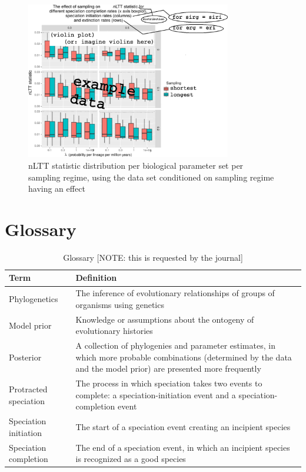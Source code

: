 \documentclass{article}
\begin{document}
\begin{figure}[!htbp]
  \includegraphics[width=0.8\textwidth]{fig_sampling.png}
  \caption{
    nLTT statistic distribution per biological parameter set per sampling
    regime, using the data set conditioned on sampling regime having an effect 
  }
\end{figure}

\section{Glossary}
\begin{table}
  \centering 
  \begin{tabular}{l p{}}
    \hline
    Term                  & Definition \\
    \hline
    \hline
    Phylogenetics         & The inference of evolutionary relationships of groups of organisms using genetics \\
    Model prior           & Knowledge or assumptions about the ontogeny of evolutionary histories \\
    Posterior             & A collection of phylogenies and parameter estimates, in which more probable combinations (determined by the data and the model prior) are presented more frequently \\
    Protracted speciation & The process in which speciation takes two events to complete: a speciation-initiation event and a speciation-completion event  \\
    Speciation initiation & The start of a speciation event creating an incipient species \\
    Speciation completion & The end of a speciation event, in which an incipient species is recognized as a good species \\
    \hline
  \end{tabular}
  \caption{
    Glossary [NOTE: this is requested by the journal]
  }
  \label{table:glossary}
\end{table}
\end{document}

